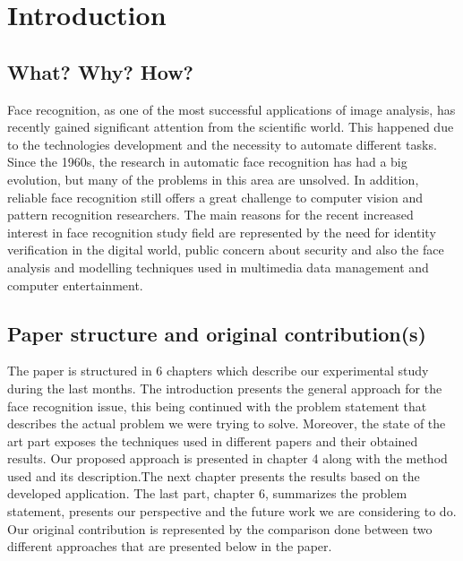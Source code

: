 \documentclass[runningheads,a4paper,11pt]{report}
\begin{document}
\newpage




\newpage






\chapter{Introduction}
\label{chapter:introduction}

\section{What? Why? How?}
\label{section:what}

Face recognition, as one of the most successful applications of image analysis, has recently gained significant attention from the scientific world. This happened due to the technologies development and the necessity to automate different tasks. Since the 1960s, the research in automatic face recognition has had a big evolution, but many of the problems in this area are unsolved. In addition, reliable face recognition still offers a great challenge to computer vision and pattern recognition researchers. The main reasons for the recent increased interest in face recognition study field are represented by the need for identity verification in the digital world, public concern about security and also the face analysis and modelling techniques used in multimedia data management and computer entertainment.



\section{Paper structure and original contribution(s)}
\label{section:structure}
The paper is structured in 6 chapters which describe our experimental study during the last months. The introduction presents the general approach for the face recognition issue, this being continued with the problem statement that describes the actual problem we were trying to solve. Moreover, the state of the art part exposes the techniques used in different papers and their obtained results. Our proposed approach is presented in chapter 4 along with the method used and its description.The next chapter presents the results based on the developed application. The last part, chapter 6, summarizes the problem statement, presents our perspective and the future work we are considering to do.
Our original contribution is represented by the comparison done between two different approaches that are presented below in the paper.
\end{document}
